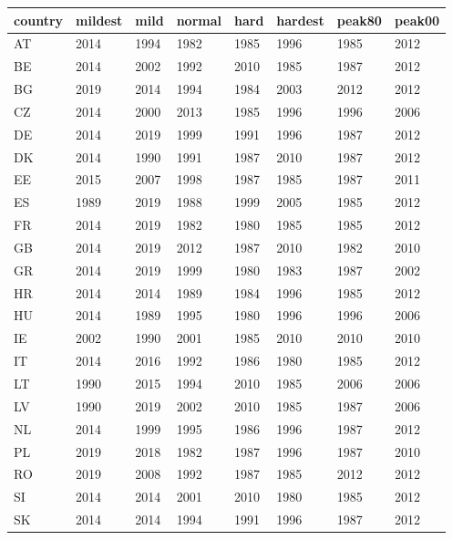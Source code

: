 \documentclass[12pt]{article}
\begin{document}
\begin{table}[h!]
\centering
\begin{tabular}{l|lllllll}
country   & mildest & mild & normal & hard & hardest & peak80 & peak00 \\ \hline
AT & 2014    & 1994 & 1982   & 1985 & 1996    & 1985   & 2012   \\
BE & 2014    & 2002 & 1992   & 2010 & 1985    & 1987   & 2012   \\
BG & 2019    & 2014 & 1994   & 1984 & 2003    & 2012   & 2012   \\
CZ & 2014    & 2000 & 2013   & 1985 & 1996    & 1996   & 2006   \\
DE & 2014    & 2019 & 1999   & 1991 & 1996    & 1987   & 2012   \\
DK & 2014    & 1990 & 1991   & 1987 & 2010    & 1987   & 2012   \\
EE & 2015    & 2007 & 1998   & 1987 & 1985    & 1987   & 2011   \\
ES & 1989    & 2019 & 1988   & 1999 & 2005    & 1985   & 2012   \\
FR & 2014    & 2019 & 1982   & 1980 & 1985    & 1985   & 2012   \\
GB & 2014    & 2019 & 2012   & 1987 & 2010    & 1982   & 2010   \\
GR & 2014    & 2019 & 1999   & 1980 & 1983    & 1987   & 2002   \\
HR & 2014    & 2014 & 1989   & 1984 & 1996    & 1985   & 2012   \\
HU & 2014    & 1989 & 1995   & 1980 & 1996    & 1996   & 2006   \\
IE & 2002    & 1990 & 2001   & 1985 & 2010    & 2010   & 2010   \\
IT & 2014    & 2016 & 1992   & 1986 & 1980    & 1985   & 2012   \\
LT & 1990    & 2015 & 1994   & 2010 & 1985    & 2006   & 2006   \\
LV & 1990    & 2019 & 2002   & 2010 & 1985    & 1987   & 2006   \\
NL & 2014    & 1999 & 1995   & 1986 & 1996    & 1987   & 2012   \\
PL & 2019    & 2018 & 1982   & 1987 & 1996    & 1987   & 2010   \\
RO & 2019    & 2008 & 1992   & 1987 & 1985    & 2012   & 2012   \\
SI & 2014    & 2014 & 2001   & 2010 & 1980    & 1985   & 2012   \\
SK & 2014    & 2014 & 1994   & 1991 & 1996    & 1987   & 2012   \\

\end{tabular}
\end{table}
\end{document}
